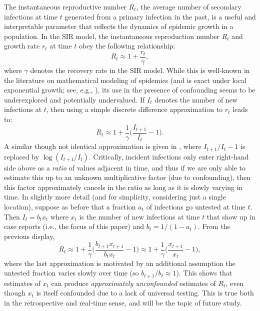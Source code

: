 \documentclass[sts]{imsart}
\theoremstyle{plain}
\theoremstyle{definition}
\theoremstyle{remark}
\begin{document}
The instantaneous reproductive number $R_t$, the average number of secondary
infections at time $t$ generated from a primary infection in the past, is a
useful and interpretable parameter that reflects the dynamics of epidemic growth
in a population. In the SIR model, the instantaneous reproduction number $R_t$
and growth rate $r_t$ at time $t$ obey the following relationship:
\[
R_t \approx 1 + \frac{r_t}{\gamma}, 
\] 
where $\gamma$ denotes the recovery rate in the SIR model. While this is
well-known in the literature on mathematical modeling of epidemics (and is exact
under local exponential growth; see, e.g., \citet{Wallinga:2007}), its use in
the presence of confounding seems to be underexplored and potentially
undervalued. If $I_t$ denotes the number of new infections at $t$, then using a
simple discrete difference approximation to $r_t$ leads to: 
\[
R_t \approx 1 + \frac{1}{\gamma}\bigg( \frac{I_{t+1}}{I_t} - 1 \bigg). 
\]
A similar though not identical approximation is given in
\citet{Bettencourt:2008}, where $I_{t+1}/I_t-1$ is replaced by
$\log(I_{t+1}/I_t)$. Critically, incident infections only enter right-hand side
above as a \emph{ratio} of values adjacent in time, and thus if we are only able
to estimate this up to an unknown multiplicative factor (due to confounding),
then this factor approximately cancels in the ratio as long as it is slowly
varying in time. In slightly more detail (and for simplicity, considering just a
single location), suppose as before that a fraction $a_t$ of infections go
untested at time $t$. Then $I_t = b_t x_t$ where $x_t$ is the number of new
infections at time $t$ that show up in case reports (i.e., the focus of this
paper) and $b_t = 1/(1-a_t)$. From the previous display,   
\[
R_t \approx 1 + \frac{1}{\gamma}\bigg( \frac{b_{t+1} x_{t+1}}{b_t x_t} - 1
\bigg) \approx 1 + \frac{1}{\gamma}\bigg( \frac{x_{t+1}}{x_t} - 1 \bigg),
\]
where the last approximation is motivated by an additional assumption the 
untested fraction varies slowly over time (so $b_{t+1}/b_t \approx
1$). This shows that estimates of $x_t$ can produce \emph{approximately
  unconfounded} estimates of $R_t$, even though $x_t$ is itself confounded
due to a lack of universal testing. This is true both in the retrospective and 
real-time sense, and will be the topic of future study.     

\end{document}
